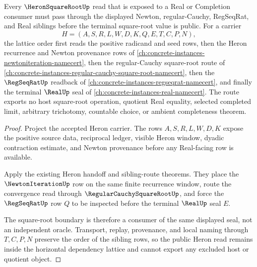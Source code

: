 \begin{theorem}
\label{thm:heron-square-root-sibling-dependency-lattice}
Every $\HeronSquareRootUp$ read that is exposed to a Real or Completion consumer must pass through the displayed Newton, regular-Cauchy, RegSeqRat, and Real siblings before the terminal square-root value is public. For a carrier
$$
H=(A,S,R,L,W,D,K,Q,E,T,C,P,N),
$$
the lattice order first reads the positive radicand and seed rows, then the Heron recurrence and Newton provenance rows of \autoref{ch:concrete-instances-newtoniteration-namecert}, then the regular-Cauchy square-root route of \autoref{ch:concrete-instances-regular-cauchy-square-root-namecert}, then the $\RegSeqRatUp$ readback of \autoref{ch:concrete-instances-regseqrat-namecert}, and finally the terminal $\RealUp$ seal of \autoref{ch:concrete-instances-real-namecert}. The route exports no host square-root operation, quotient Real equality, selected completed limit, arbitrary trichotomy, countable choice, or ambient completeness theorem.
\end{theorem}
\begin{proof}
Project the accepted Heron carrier. The rows $A,S,R,L,W,D,K$ expose the positive source data, reciprocal ledger, visible Heron window, dyadic contraction estimate, and Newton provenance before any Real-facing row is available.

Apply the existing Heron handoff and sibling-route theorems. They place the $\NewtonIterationUp$ row on the same finite recurrence window, route the convergence read through $\RegularCauchySquareRootUp$, and force the $\RegSeqRatUp$ row $Q$ to be inspected before the terminal $\RealUp$ seal $E$.

The square-root boundary is therefore a consumer of the same displayed seal, not an independent oracle. Transport, replay, provenance, and local naming through $T,C,P,N$ preserve the order of the sibling rows, so the public Heron read remains inside the horizontal dependency lattice and cannot export any excluded host or quotient object.
\end{proof}
